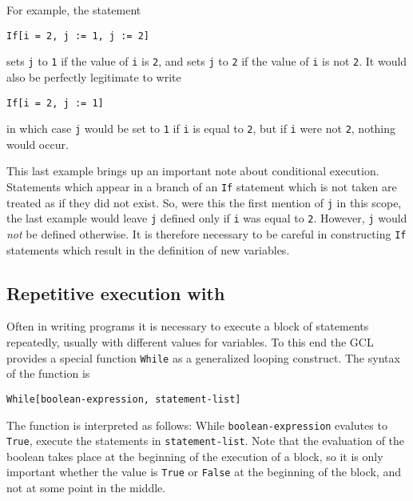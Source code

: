 For example, the statement

\begin{verbatim}
If[i = 2, j := 1, j := 2]
\end{verbatim}

\noindent sets \verb+j+ to \verb+1+ if the value of \verb+i+ is
\verb+2+, and sets \verb+j+ to \verb+2+ if the value of \verb+i+ is
not \verb+2+.  It would also be perfectly legitimate to write

\begin{verbatim}
If[i = 2, j := 1]
\end{verbatim}

\noindent in which case \verb+j+ would be set to \verb+1+ if \verb+i+
is equal to \verb+2+, but if \verb+i+ were not \verb+2+, nothing would
occur.

This last example brings up an important note about conditional
execution.  Statements which appear in a branch of an \verb+If+
statement which is not taken are treated as if they did not exist.
So, were this the first mention of \verb+j+ in this scope, the last
example would leave \verb+j+ defined only if \verb+i+ was equal to
\verb+2+.  However, \verb+j+ would {\em not} be defined otherwise.  It
is therefore necessary to be careful in constructing \verb+If+
statements which result in the definition of new variables.

\subsection{Repetitive execution with }

Often in writing programs it is necessary to execute a block of
statements repeatedly, usually with different values for variables.
To this end the GCL provides a special function \verb+While+ as a
generalized looping construct.  The syntax of the function is

\begin{verbatim}
While[boolean-expression, statement-list]
\end{verbatim}

The function is interpreted as follows: While
\verb+boolean-expression+ evalutes to \verb+True+, execute the
statements in \verb+statement-list+.  Note that the evaluation of the
boolean takes place at the beginning of the execution of a block, so
it is only important whether the value is \verb+True+ or \verb+False+
at the beginning of the block, and not at some point in the middle.

